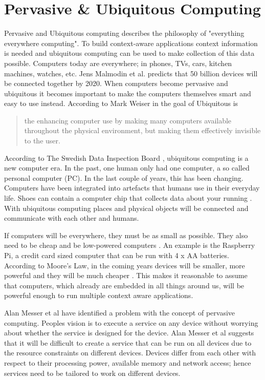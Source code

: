 \section{Pervasive \& Ubiquitous Computing}
Pervasive and Ubiquitous computing describes the philosophy of "everything everywhere computing". To build context-aware applications context information is needed and ubiquitous computing can be used to make collection of this data possible.
Computers today are everywhere; in phones, TVs, cars, kitchen machines, watches, etc. Jens Malmodin et al. \cite{fehske2011global} predicts that 50 billion devices will be connected together by 2020. When computers become pervasive and ubiquitous it becomes important to make the computers themselves smart and easy to use instead. According to Mark Weiser in \cite{237456} the goal of Ubiquitous is 

\begin{quotation}
\centering
[...] the enhancing computer use by making many computers available throughout the physical environment, but making them effectively invisible to the user.
\end{quotation}

According to The Swedish Data Inspection Board \cite{datainspect}, ubiquitous computing is a new computer era. In the past, one human only had one computer, a so called personal computer (PC). In the last couple of years, this has been changing. Computers have been integrated into artefacts that humans use in their everyday life. Shoes can contain a computer chip that collects data about your running \cite{saponas2006devices}. With ubiquitous computing places and physical objects will be connected and communicate with each other and humans. 

If computers will be everywhere, they must be as small as possible. They also need to be cheap and be low-powered computers \cite{datainspect}. An example is the Raspberry Pi, a credit card sized computer that can be run with 4 x AA batteries. According to Moore's Law, in the coming years devices will be smaller, more powerful and they will be much cheaper \cite{591665}. This makes it reasonable to assume that computers, which already are embedded in all things around us, will be powerful enough to run multiple context aware applications.

Alan Messer et al \cite{alanmesser} have identified a problem with the concept of pervasive computing. Peoples vision is to execute a service on any device without worrying about whether the service is designed for the device. Alan Messer et al suggests that it will be difficult to create a service that can be run on all devices due to the resource constraints on different devices. Devices differ from each other with respect to their processing power, available memory and network access; hence services need to be tailored to work on different devices.


